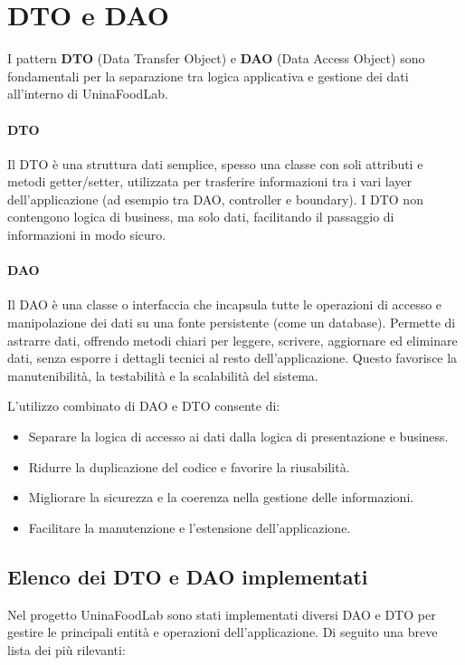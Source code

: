 \section{DTO e DAO}

I pattern \textbf{DTO} (Data Transfer Object) e \textbf{DAO} (Data Access Object) sono fondamentali per la separazione tra logica applicativa e gestione dei dati all'interno di UninaFoodLab.

\paragraph{DTO}
Il DTO è una struttura dati semplice, spesso una classe con soli attributi e metodi getter/setter, utilizzata per trasferire informazioni tra i vari layer dell'applicazione (ad esempio tra DAO, controller e boundary). I DTO non contengono logica di business, ma solo dati, facilitando il passaggio di informazioni in modo sicuro.

\paragraph{DAO}
Il DAO è una classe o interfaccia che incapsula tutte le operazioni di accesso e manipolazione dei dati su una fonte persistente (come un database). Permette di astrarre dati, offrendo metodi chiari per leggere, scrivere, aggiornare ed eliminare dati, senza esporre i dettagli tecnici al resto dell'applicazione. Questo favorisce la manutenibilità, la testabilità e la scalabilità del sistema.

L'utilizzo combinato di DAO e DTO consente di:
\begin{itemize}
    \item Separare la logica di accesso ai dati dalla logica di presentazione e business.
    \item Ridurre la duplicazione del codice e favorire la riusabilità.
    \item Migliorare la sicurezza e la coerenza nella gestione delle informazioni.
    \item Facilitare la manutenzione e l'estensione dell'applicazione.
\end{itemize}

\subsection{Elenco dei DTO e DAO implementati}
Nel progetto UninaFoodLab sono stati implementati diversi DAO e DTO per gestire le principali entità e operazioni dell'applicazione. Di seguito una breve lista dei più rilevanti:


